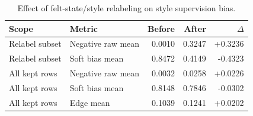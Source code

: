 \begin{table}[t]
\centering
\caption{Effect of felt-state/style relabeling on style supervision bias.}
\begin{tabular}{llrrr}
\toprule
Scope & Metric & Before & After & $\Delta$ \\
\midrule
Relabel subset & Negative raw mean & 0.0010 & 0.3247 & +0.3236 \\
Relabel subset & Soft bias mean & 0.8472 & 0.4149 & -0.4323 \\
All kept rows & Negative raw mean & 0.0032 & 0.0258 & +0.0226 \\
All kept rows & Soft bias mean & 0.8148 & 0.7846 & -0.0302 \\
All kept rows & Edge mean & 0.1039 & 0.1241 & +0.0202 \\
\bottomrule
\end{tabular}
\label{tab:style-relabel-v1}
\end{table}
